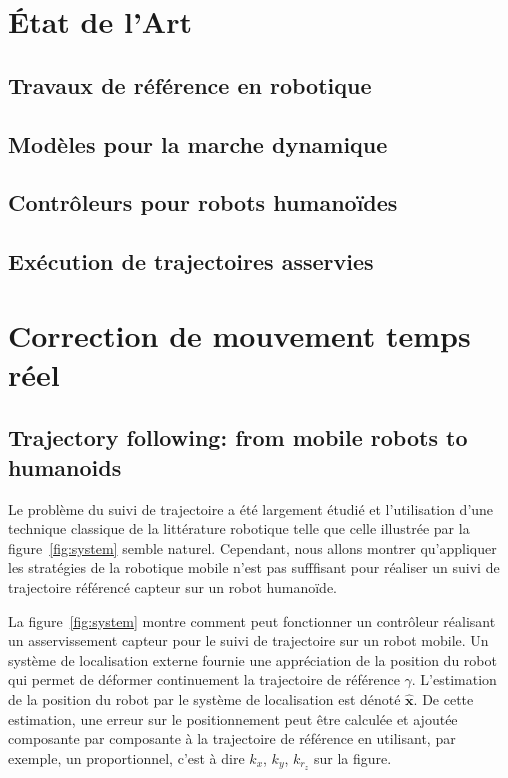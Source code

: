 \section{État de l'Art}

\subsection{Travaux de référence en robotique}
\subsection{Modèles pour la marche dynamique}
\subsection{Contrôleurs pour robots humanoïdes}
\subsection{Exécution de trajectoires asservies}




\section{Correction de mouvement temps réel}
\subsection{Trajectory following: from mobile robots to humanoids}


Le problème du suivi de trajectoire a été largement étudié et
l'utilisation d'une technique classique de la littérature robotique
telle que celle illustrée par la figure~\ref{fig:system} semble
naturel. Cependant, nous allons montrer qu'appliquer les stratégies de
la robotique mobile n'est pas sufffisant pour réaliser un suivi de
trajectoire référencé capteur sur un robot humanoïde.


La figure~\ref{fig:system} montre comment peut fonctionner un
contrôleur réalisant un asservissement capteur pour le suivi de
trajectoire sur un robot mobile. Un système de localisation externe
fournie une appréciation de la position du robot qui permet de
déformer continuement la trajectoire de référence
$\gamma$. L'estimation de la position du robot par le système de
localisation est dénoté $\hat{\mathbf{x}}$. De cette estimation, une
erreur sur le positionnement peut être calculée et ajoutée composante
par composante à la trajectoire de référence en utilisant, par
exemple, un proportionnel, c'est à dire $k_x$, $k_y$, $k_{r_z}$ sur la
figure.


